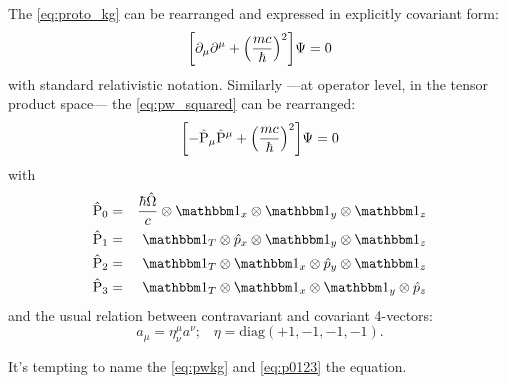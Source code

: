The \eqref{eq:proto_kg} can be rearranged and expressed in explicitly covariant form:
\begin{equation}
  \qty[\partial_{\mu}\partial^{\mu} + \qty(\frac{mc}{\hbar})^2]\Psi = 0
\end{equation}
with standard relativistic notation.
Similarly
---at operator level, in the tensor product space---
the \eqref{eq:pw_squared} can be rearranged:
\begin{equation}\label{eq:pwkg}
  \qty[- \hat{\mathrm{P}}_{\mu} \hat{\mathrm{P}}^{\mu} + \qty(\frac{mc}{\hbar})^2]\Psi = 0
\end{equation}
with
\begin{equation}
\begin{aligned}\label{eq:p0123}
  \hat{\mathrm{P}}_0 &=& \frac{\hbar\hat{\Omega}}{c}  \ox \idop_x   \ox \idop_y   \ox \idop_z \\
  \hat{\mathrm{P}}_1 &=& \idop_T                      \ox \hat{p}_x \ox \idop_y   \ox \idop_z \\
  \hat{\mathrm{P}}_2 &=& \idop_T                      \ox \idop_x   \ox \hat{p}_y \ox \idop_z \\
  \hat{\mathrm{P}}_3 &=& \idop_T                      \ox \idop_x   \ox \idop_y   \ox \hat{p}_z
\end{aligned}
\end{equation}
and the usual relation between contravariant and covariant 4-vectors:
\begin{equation}
  a_\mu = \eta_{\nu}^{\mu} a^{\nu} \text{;} \quad
  \eta = \mathrm{diag}(+1, -1, -1, -1)
  \text{.}
\end{equation}

It's tempting to name the \eqref{eq:pwkg} and \eqref{eq:p0123} the  equation.

